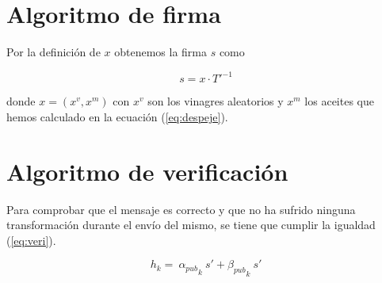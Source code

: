 \documentclass[11pt]{article}
\begin{document}
\section{Algoritmo de firma}
Por la definición de $x$ obtenemos la firma $s$ como

\begin{equation}
	s = x \cdot T'^{-1}
\end{equation}

donde $x = (x^v, x^m)$ con $x^v$ son los vinagres aleatorios y $x^m$ los aceites que hemos calculado en la ecuación (\ref{eq:despeje}).




\section{Algoritmo de verificación}

Para comprobar que el mensaje es correcto y que no ha sufrido ninguna transformación durante el envío del mismo, se tiene que cumplir la igualdad (\ref{eq:veri}).


\begin{equation}\label{eq:veri}
	h_k = \ {\alpha_{pub}}_k \ s' + {\beta_{pub}}_{k} \ s'
\end{equation}
\end{document}
